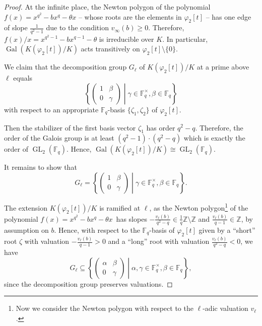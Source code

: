 \documentclass[10pt,a4paper]{amsart}
\theoremstyle{plain} %
\theoremstyle{definition}
\theoremstyle{remark}
\newcommand{\FF}{\mathbb{F}}
\newcommand{\ZZ}{\mathbb{Z}}  %
\newcommand{\Fq}{\FF_{\!q}}  %
\newcommand{\Gal}{\operatorname{Gal}}
\newcommand{\GL}{\operatorname{GL}}
\numberwithin{equation}{subsection}
\begin{document}
\begin{proof}
At the infinite place, the Newton polygon of the polynomial $f(x)=x^{q^2}-bx^q-\theta x$ -- whose roots are the elements in $\varphi_2[t]$ --  has one edge of slope $\frac{1}{q^2-1}$ due to the condition $v_\infty(b)\geq 0$. Therefore, $f(x)/x=x^{q^2-1}-bx^{q-1}-\theta$ is irreducible over $K$. In particular, $\Gal(K(\varphi_2[t])/K)$ acts transitively on $\varphi_2[t]\setminus \{0\}$.

We claim that the decomposition group $G_\ell$ of $K(\varphi_2[t])/K$ at a prime above $\ell$ equals
\[ \left\{ \begin{pmatrix} 1 & \beta \\ 0 & \gamma \end{pmatrix} \middle| \gamma\in \Fq^\times, \beta\in \Fq \right\} \]
with respect to an appropriate $\Fq$-basis $\{\zeta_1, \zeta_2\}$ of $\varphi_2[t]$.

Then the stabilizer of the first basis vector $\zeta_1$ has order $q^2-q$. Therefore, the order of the Galois group is at least $(q^2-1)\cdot (q^2-q)$ which is exactly the order of $\GL_2(\Fq)$.
Hence, $\Gal(K(\varphi_2[t])/K)\cong \GL_2(\Fq)$.    

\medskip

It remains to show that 
\[ G_\ell = \left\{ \begin{pmatrix} 1 & \beta \\ 0 & \gamma \end{pmatrix} \middle| \gamma\in \Fq^\times, \beta\in \Fq \right\}. \]


The extension $K(\varphi_2[t])/K$ is ramified at $\ell$, as the Newton polygon\footnote{Now we consider the Newton polygon with respect to the $\ell$-adic valuation $v_\ell$.} of the polynomial $f(x)=x^{q^2}-bx^q-\theta x\,$ has slopes $-\frac{v_\ell(b)}{q^2-q}\in \frac{1}{q}\ZZ\setminus \ZZ$ and $\frac{v_\ell(b)}{q-1}\in \ZZ$, by assumption on $b$. Hence, with respect to the $\Fq$-basis of $\varphi_2[t]$ given by a ``short'' root $\zeta$ with valuation $-\frac{v_\ell(b)}{q-1}>0$ and a ``long'' root with valuation $\frac{v_\ell(b)}{q^2-q}<0$, we have
\[ G_\ell \subseteq \left\{ \begin{pmatrix} \alpha & \beta \\ 0 & \gamma \end{pmatrix} \middle| \alpha,\gamma\in \Fq^\times, \beta\in \Fq \right\}, \]
since the decomposition group preserves valuations.


\end{proof}
\end{document}
